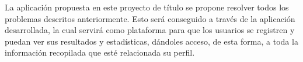 La aplicación propuesta en este proyecto de título se propone resolver todos los problemas descritos anteriormente. Esto será conseguido a través de la aplicación desarrollada, la cual servirá como plataforma para que los usuarios se registren y puedan ver sus resultados y estadísticas, dándoles acceso, de esta forma, a toda la información recopilada que esté relacionada su perfil.

